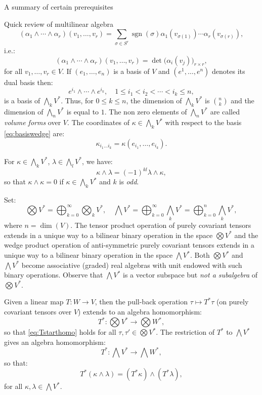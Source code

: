 \documentclass[oneside,a4paper,11pt]{amsbook}
\DeclareMathOperator{\sgn}{sgn}
\DeclareMathOperator{\Dim}{dim}
\theoremstyle{remark}\newtheorem{exercise}{Exercise}[chapter]
\theoremstyle{plain}\newtheorem{teo}{Theorem}[section]
\theoremstyle{plain}\newtheorem{lem}[teo]{Lemma}
\theoremstyle{plain}\newtheorem{prop}[teo]{Proposition}
\theoremstyle{plain}\newtheorem{cor}[teo]{Corollary}
\theoremstyle{definition}\newtheorem{defin}[teo]{Definition}
\theoremstyle{remark}\newtheorem{rem}[teo]{Remark}
\theoremstyle{definition}\newtheorem{notation}[teo]{Notation}
\theoremstyle{definition}\newtheorem{convention}[teo]{Convention}
\theoremstyle{definition}\newtheorem{example}[teo]{Example}
\numberwithin{section}{chapter}
\numberwithin{equation}{section}
\begin{document}
\begin{chapter}{A summary of certain prerequisites}
\begin{section}{Quick review of multilinear algebra}
\[(\alpha_1\wedge\cdots\wedge\alpha_r)(v_1,\ldots,v_r)=\sum_{\sigma\in S^r}\sgn(\sigma)
\alpha_1(v_{\sigma(1)})\cdots\alpha_r(v_{\sigma(r)}),\]
i.e.:
\begin{equation}\label{eq:wedgedet}
(\alpha_1\wedge\cdots\wedge\alpha_r)(v_1,\ldots,v_r)=\det\big(\alpha_i(v_j)\big)_{r\times r},
\end{equation}
for all $v_1,\ldots,v_r\in V$. If $(e_1,\ldots,e_n)$ is a basis of $V$ and $(e^1,\ldots,e^n)$ denotes its dual basis then:
\begin{equation}\label{eq:basiswedge}
e^{i_1}\wedge\cdots\wedge e^{i_k},\quad 1\le i_1<i_2<\cdots<i_k\le n,
\end{equation}
is a basis of $\bigwedge_kV^*$. Thus, for $0\le k\le n$, the dimension of $\bigwedge_kV^*$ is $\binom nk$ and the dimension of $\bigwedge_nV^*$ is equal to $1$.
The non zero elements of $\bigwedge_nV^*$ are called {\em volume forms\/} over $V$. The coordinates of $\kappa\in\bigwedge_kV^*$ with respect
to the basis \eqref{eq:basiswedge} are:
\[\kappa_{i_1\ldots i_k}=\kappa(e_{i_1},\ldots,e_{i_k}).\]

For $\kappa\in\bigwedge_kV^*$, $\lambda\in\bigwedge_lV^*$, we have:
\[\kappa\wedge\lambda=(-1)^{kl}\lambda\wedge\kappa,\]
so that $\kappa\wedge\kappa=0$ if $\kappa\in\bigwedge_k V^*$ and $k$ is {\em odd}.

Set:
\[\bigotimes V^*=\bigoplus_{k=0}^\infty\bigotimes_kV^*,\quad\bigwedge V^*=\bigoplus_{k=0}^\infty\bigwedge_kV^*
=\bigoplus_{k=0}^n\bigwedge_kV^*,\]
where $n=\Dim(V)$. The tensor product operation of purely covariant tensors extends in a unique way
to a bilinear binary operation in the space $\bigotimes V^*$ and the wedge product operation of
anti-symmetric purely covariant tensors extends in a unique way to a bilinear binary operation in the space
$\bigwedge V^*$. Both $\bigotimes V^*$ and $\bigwedge V^*$ become associative (graded) real algebras with unit endowed
with such binary operations. Observe that $\bigwedge V^*$ is a vector subspace but {\em not a subalgebra\/} of
$\bigotimes V^*$.

Given a linear map $T:W\to V$, then the pull-back operation
$\tau\mapsto T^*\tau$ (on purely covariant tensors over $V$) extends to an algebra homomorphism:
\[T^*:\bigotimes V^*\longrightarrow\bigotimes W^*,\]
so that \eqref{eq:Tstarthomo} holds for all $\tau,\tau'\in\bigotimes V^*$.
The restriction of $T^*$ to $\bigwedge V^*$ gives an algebra homomorphism:
\[T^*:\bigwedge V^*\longrightarrow\bigwedge W^*,\]
so that:
\[T^*(\kappa\wedge\lambda)=(T^*\kappa)\wedge(T^*\lambda),\]
for all $\kappa,\lambda\in\bigwedge V^*$.


\end{section}
\end{chapter}
\end{document}

